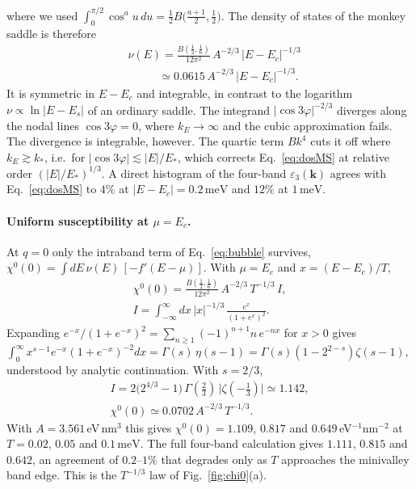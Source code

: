 \documentclass[aps,prb,twocolumn,superscriptaddress,floatfix,nofootinbib]{revtex4-2}
\newcommand{\bk}{\mathbf{k}}
\newcommand{\meV}{\,\mathrm{meV}}
\begin{document}
where we used $\int_0^{\pi/2}\cos^{a}u\,du=\tfrac12B\big(\tfrac{a+1}2,\tfrac12\big)$. The density of states of the monkey saddle is therefore
\begin{align}
&\boxed{\;\nu(E)=\frac{B(\tfrac12,\tfrac16)}{12\pi^2}\,A^{-2/3}\,|E-E_c|^{-1/3}\;}\nonumber\\
&\phantom{\nu(E)}\simeq0.0615\,A^{-2/3}\,|E-E_c|^{-1/3}.
\label{eq:dosMS}
\end{align}
It is symmetric in $E-E_c$ and integrable, in contrast to the logarithm $\nu\propto\ln|E-E_s|$ of an ordinary saddle. The integrand $|\cos3\varphi|^{-2/3}$ diverges along the nodal lines $\cos3\varphi=0$, where $k_E\to\infty$ and the cubic approximation fails. The divergence is integrable, however. The quartic term $Bk^4$ cuts it off where $k_E\gtrsim k_*$, i.e.\ for $|\cos3\varphi|\lesssim|E|/E_*$, which corrects Eq.~\eqref{eq:dosMS} at relative order $(|E|/E_*)^{1/3}$. A direct histogram of the four-band $\varepsilon_3(\bk)$ agrees with Eq.~\eqref{eq:dosMS} to $4\%$ at $|E-E_c|=0.2\meV$ and $12\%$ at $1\meV$.

\paragraph{Uniform susceptibility at $\mu=E_c$.}
At $q=0$ only the intraband term of Eq.~\eqref{eq:bubble} survives, $\chi^0(0)=\int dE\,\nu(E)\,[-f'(E-\mu)]$. With $\mu=E_c$ and $x=(E-E_c)/T$,
\begin{gather}
\chi^0(0)=\frac{B(\tfrac12,\tfrac16)}{12\pi^2}\,A^{-2/3}\,T^{-1/3}\,I,\nonumber\\
I=\int_{-\infty}^{\infty}\!dx\,|x|^{-1/3}\,\frac{e^x}{(1+e^x)^2}.
\end{gather}
Expanding $e^{-x}/(1+e^{-x})^2=\sum_{n\ge1}(-1)^{n+1}n\,e^{-nx}$ for $x>0$ gives $\int_0^\infty x^{s-1}e^{-x}(1+e^{-x})^{-2}dx=\Gamma(s)\,\eta(s-1)=\Gamma(s)(1-2^{2-s})\zeta(s-1)$, understood by analytic continuation. With $s=2/3$,
\begin{gather}
I=2\big(2^{4/3}-1\big)\,\Gamma(\tfrac23)\,\big|\zeta(-\tfrac13)\big|\simeq1.142,\nonumber\\
\chi^0(0)\simeq0.0702\,A^{-2/3}\,T^{-1/3}.
\end{gather}
With $A=3.561\,$eV\,nm$^3$ this gives $\chi^0(0)=1.109$, $0.817$ and $0.649\,$eV$^{-1}$nm$^{-2}$ at $T=0.02$, $0.05$ and $0.1\meV$. The full four-band calculation gives $1.111$, $0.815$ and $0.642$, an agreement of $0.2$--$1\%$ that degrades only as $T$ approaches the minivalley band edge. This is the $T^{-1/3}$ law of Fig.~\ref{fig:chi0}(a).
\end{document}
